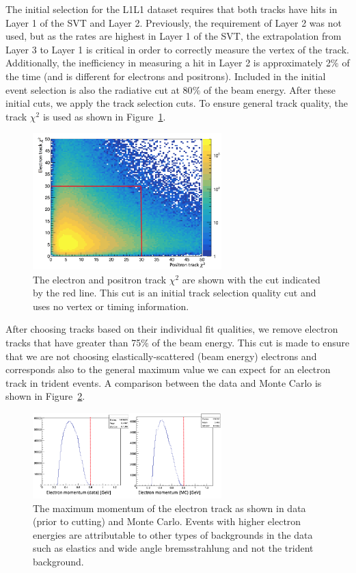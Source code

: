 The initial selection for the L1L1 dataset requires that both tracks have hits in Layer 1 of the SVT and Layer 2. Previously, the requirement of Layer 2 was not used, but as the rates are highest in Layer 1 of the SVT, the extrapolation from Layer 3 to Layer 1 is critical in order to correctly measure the vertex of the track. Additionally, the inefficiency in measuring a hit in Layer 2 is approximately 2$\%$ of the time (and is different for electrons and positrons). Included in the initial event selection is also the radiative cut at 80$\%$ of the beam energy. After these initial cuts, we apply the track selection cuts. To ensure general track quality, the track $\chi^2$ is used as shown in Figure~\ref{fig:trkChi2}.

\begin{figure}[htb]
  \centering
      \includegraphics[width=0.65\textwidth]{pics/searching/trkChi2.png}
  \caption[Track $\chi^2$ cut]{The electron and positron track $\chi^2$ are shown with the cut indicated by the red line. This cut is an initial track selection quality cut and uses no vertex or timing information.}
  \label{fig:trkChi2}
\end{figure} 

After choosing tracks based on their individual fit qualities, we remove electron tracks that have greater than 75$\%$ of the beam energy. This cut is made to ensure that we are not choosing elastically-scattered (beam energy) electrons and corresponds also to the general maximum value we can expect for an electron track in trident events. A comparison between the data and Monte Carlo is shown in Figure~\ref{fig:emTrkPmax}.

\begin{figure}[htb]
  \centering
      \includegraphics[width=0.65\textwidth]{pics/searching/emTrkPmax.png}
  \caption[Maximum $e-$ track momentum]{The maximum momentum of the electron track as shown in data (prior to cutting) and Monte Carlo. Events with higher electron energies are attributable to other types of backgrounds in the data such as elastics and wide angle bremsstrahlung and not the trident background.}
  \label{fig:emTrkPmax}
\end{figure} 

